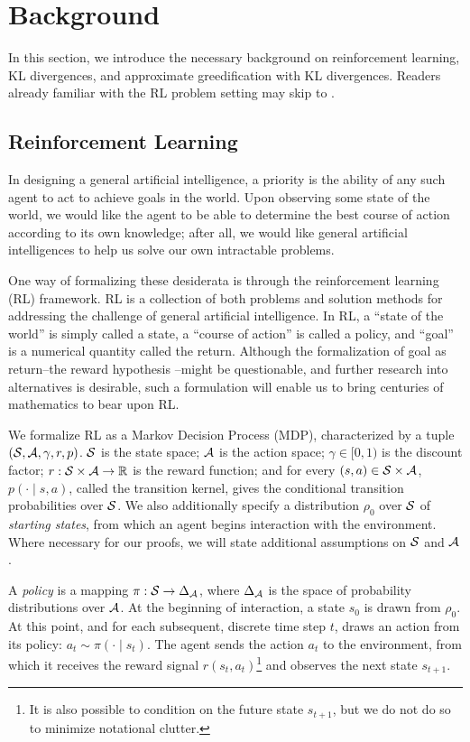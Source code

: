 \documentclass[\main/thesis.tex]{subfiles}
\begin{document}
\chapter{Background}
In this section, we introduce the necessary background on reinforcement learning, KL divergences, and approximate greedification with KL divergences. Readers already familiar with the RL problem setting may skip to .

\section{Reinforcement Learning}
In designing a general artificial intelligence, a priority is the ability of any such agent to act to achieve goals in the world. Upon observing some state of the world, we would like the agent to be able to determine the best course of action according to its own knowledge; after all, we would like general artificial intelligences to help us solve our own intractable problems. 

One way of formalizing these desiderata is through the reinforcement learning (RL) framework. RL is a collection of both problems and solution methods for addressing the challenge of general artificial intelligence. In RL, a ``state of the world'' is simply called a state, a ``course of action'' is called a policy, and ``goal'' is a numerical quantity called the return. Although the formalization of goal as return--the reward hypothesis \citep{sutton2018reinforcement}--might be questionable, and further research into alternatives is desirable, such a formulation will enable us to bring centuries of mathematics to bear upon RL. 

We formalize RL as a {Markov Decision Process} (MDP), characterized by a tuple $(\mathcal{S}, \mathcal{A}, \gamma, r, p)$. $\mathcal{S}$ is the state space; $\mathcal{A}$ is the action space; $\gamma \in [0,1)$ is the discount factor; $r : \mathcal{S} \times \mathcal{A} \to \mathbb{R}$ is the reward function; and for every $(s, a) \in \mathcal{S} \times \mathcal{A}$, $p(\cdot \mid s, a)$, called the transition kernel, gives the conditional transition probabilities over $\mathcal{S}$. We also additionally specify a distribution $\rho_0$ over $\mathcal{S}$ of \textit{starting states}, from which an agent begins interaction with the environment. Where necessary for our proofs, we will state additional assumptions on $\mathcal{S}$ and $\mathcal{A}$. 

A \textit{policy} is a mapping $\pi : \mathcal{S} \to \Delta_{\mathcal{A}}$, where $\Delta_{\mathcal{A}}$ is the space of probability distributions over $\mathcal{A}$. 
%
At the beginning of interaction, a state $s_0$ is drawn from $\rho_0$. At this point, and for each subsequent, discrete time step $t$, draws an action from its policy: $a_t \sim \pi(\cdot \mid s_t)$. The agent sends the action $a_t$ to the environment, from which it receives the reward signal $r(s_t, a_t)$\footnote{It is also possible to condition on the future state $s_{t + 1}$, but we do not do so to minimize notational clutter.} and observes the next state $s_{t + 1}$. 
\end{document}
